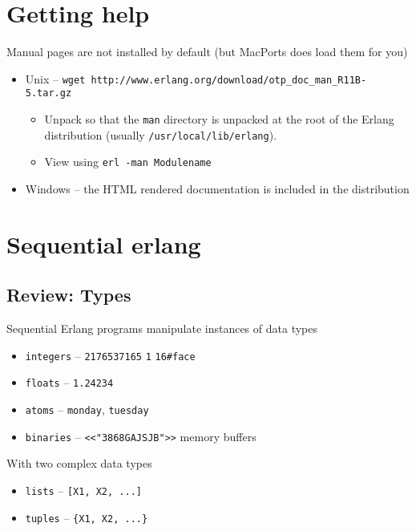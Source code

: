 \documentclass[12pt]{article}
\begin{document}
\section{Getting help}

Manual pages are not installed by default (but MacPorts does load 
them for you)

\begin{itemize}
\item Unix --
  \verb+wget http://www.erlang.org/download/otp_doc_man_R11B-5.tar.gz+
  \begin{itemize}
  \item Unpack so that the \verb+man+ directory is unpacked at the root
    of the Erlang distribution (usually \verb+/usr/local/lib/erlang+).
  \item View using \verb+erl -man Modulename+
  \end{itemize}
    
\item Windows -- the HTML rendered documentation is included in the distribution
\end{itemize}

\section{Sequential erlang}

\subsection{Review: Types}

Sequential Erlang programs manipulate instances of data types

\begin{itemize}
\item \verb+integers+ -- \verb+2176537165+ \verb+1+ \verb+16#face+
\item \verb+floats+ -- \verb+1.24234+
\item \verb+atoms+ -- \verb+monday+, \verb+tuesday+
\item \verb+binaries+ -- \verb+<<"3868GAJSJB">>+ memory buffers
\end{itemize}

With two complex data types

\begin{itemize}
\item \verb+lists+ -- \verb+[X1, X2, ...]+
\item \verb+tuples+ -- \verb+{X1, X2, ...}+
\end{itemize}
\end{document}
